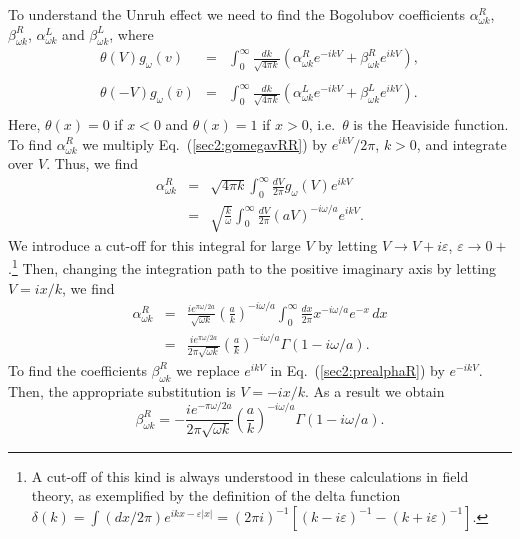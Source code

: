\documentclass[12pt,nofootinbib,floatfix,aps,prd,showpacs,amsmath,amssymb,eqsecnum]{revtex4-2}
\begin{document}
To understand the Unruh effect we need to find the Bogolubov
coefficients $\alpha^R_{\omega k}$, $\beta^R_{\omega k}$,
$\alpha^L_{\omega k}$ and $\beta^L_{\omega k}$, where
\begin{eqnarray}
\theta(V)g_\omega(v)
& = & 
\int_0^\infty \frac{dk}{\sqrt{4\pi
k}}\left(\alpha^R_{\omega k}e^{-ikV}
+\beta^R_{\omega k}e^{ikV}\right),\nonumber \\
 \label{sec2:gomegavRR}\\
\theta(-V)g_\omega(\bar{v})
& = &  
\int_0^\infty \frac{dk}{\sqrt{4\pi
k}}\left(\alpha^L_{\omega k}e^{-ikV}
+\beta^L_{\omega k}e^{ikV}\right). \nonumber \\
\label{sec2:gomegavLR}
\end{eqnarray}
Here, $\theta(x)=0$ if $x<0$ and $\theta(x)=1$ if $x>0$, i.e.~$\theta$
is the Heaviside function.  
To find $\alpha^R_{\omega k}$ we multiply Eq.~(\ref{sec2:gomegavRR}) by
$e^{ikV}/2\pi$, $k>0$, and integrate over $V$. Thus, we find
\begin{eqnarray}
\alpha^R_{\omega k}
& = & \sqrt{4\pi k}\int_0^\infty \frac{dV}{2\pi} g_{\omega}(V)e^{ikV}\nonumber \\
& = & \sqrt{\frac{k}{\omega}}\int_0^\infty
\frac{dV}{2\pi}(aV)^{-i\omega/a}e^{ikV}. \label{sec2:prealphaR}
\end{eqnarray}
We introduce a cut-off for this integral for
large $V$ by letting $V \to V+i\varepsilon$, 
$\varepsilon \to 0+$.\footnote{A cut-off of this kind
is always understood
in these calculations in field theory, as exemplified by the definition
of the delta function $\delta(k) =
\int (dx/2\pi)e^{ikx -\varepsilon |x|} = (2\pi
i)^{-1}[(k-i\varepsilon)^{-1} - (k+i\varepsilon)^{-1}]$.}
Then, changing the integration path to the
positive imaginary axis by letting $V=ix/k$, we find
\begin{eqnarray}
\alpha^R_{\omega k}
 & = &
\frac{ie^{\pi\omega/2a}}{\sqrt{\omega k}}\left(\frac{a}{k}\right)^{-i\omega/a}
\int_0^\infty 
\frac{dx}{2\pi}x^{-i\omega/a}e^{-x}\,dx\nonumber \\
& = & \frac{ie^{\pi\omega/2a}}{2\pi\sqrt{\omega k}}
\left(\frac{a}{k}\right)^{-i\omega/a}\Gamma(1-i\omega/a).
\label{sec2:alphaR}
\end{eqnarray}
To find the coefficients $\beta^R_{\omega k}$ we replace $e^{ikV}$ in
Eq.~(\ref{sec2:prealphaR}) by $e^{-ikV}$.  Then, the appropriate 
substitution is
$V=-ix/k$. As a result we obtain
\begin{equation}
\beta^R_{\omega k}
= - \frac{ie^{-\pi\omega/2a}}{2\pi\sqrt{\omega k}}
\left(\frac{a}{k}\right)^{-i\omega/a}\Gamma(1-i\omega/a).
\end{equation}
\end{document}
